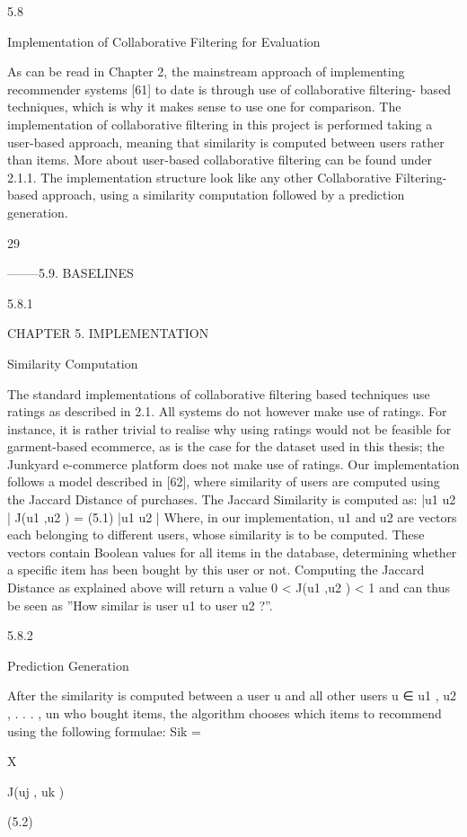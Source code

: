 5.8

Implementation of Collaborative Filtering for Evaluation

As can be read in Chapter 2, the mainstream approach of implementing recommender
systems [61] to date is through use of collaborative filtering- based techniques, which
is why it makes sense to use one for comparison. The implementation of collaborative
filtering in this project is performed taking a user-based approach, meaning that similarity is computed between users rather than items. More about user-based collaborative
filtering can be found under 2.1.1. The implementation structure look like any other
Collaborative Filtering-based approach, using a similarity computation followed by a
prediction generation.

29

--------5.9. BASELINES

5.8.1

CHAPTER 5. IMPLEMENTATION

Similarity Computation

The standard implementations of collaborative filtering based techniques use ratings as
described in 2.1. All systems do not however make use of ratings. For instance, it is
rather trivial to realise why using ratings would not be feasible for garment-based ecommerce, as is the case for the dataset used in this thesis; the Junkyard e-commerce
platform does not make use of ratings.
Our implementation follows a model described in [62], where similarity of users are
computed using the Jaccard Distance of purchases. The Jaccard Similarity is computed
as:
|u1  u2 |
J(u1 ,u2 ) =
(5.1)
|u1  u2 |
Where, in our implementation, u1 and u2 are vectors each belonging to different users,
whose similarity is to be computed. These vectors contain Boolean values for all items in
the database, determining whether a specific item has been bought by this user or not.
Computing the Jaccard Distance as explained above will return a value 0 < J(u1 ,u2 ) < 1
and can thus be seen as ”How similar is user u1 to user u2 ?”.

5.8.2

Prediction Generation

After the similarity is computed between a user u and all other users u ∈ {u1 , u2 , . . . , un }
who bought items, the algorithm chooses which items to recommend using the following
formulae:
Sik =

X

J(uj , uk )

(5.2)

